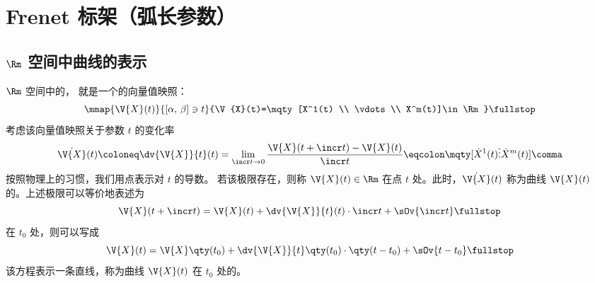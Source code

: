 \section{Frenet 标架（弧长参数）}
\subsection{\texorpdfstring{$\Rm$}{R\^{}m} 空间中曲线的表示}
$\Rm$ 空间中的，
就是一个的向量值映照：
\begin{equation}
	\mmap{\V{X}(t)}{[\alpha,\,\beta]\ni t}
		{\V{X}(t)=\mqty[X^1(t) \\ \vdots \\ X^m(t)]\in\Rm} \fullstop
\end{equation}
考虑该向量值映照关于参数 $t$ 的变化率
\begin{equation}
	\dot{\V{X}}(t)\coloneq\dv{\V{X}}{t} (t)
	=\lim_{\incr t\to 0} \frac{\V{X}(t+\incr t)-\V{X}(t)}{\incr t}
	\eqcolon \mqty[\dot{X}^1(t) \\ \vdots \\ \dot{X}^m(t)] \comma
\end{equation}
按照物理上的习惯，我们用点表示对 $t$ 的导数。
若该极限存在，则称 $\V{X}(t)\in\Rm$ 在点 $t$
处。此时，$\dot{\V{X}}(t)$ 称为曲线
$\V{X}(t)$ 的。上述极限可以等价地表述为
\begin{equation}
	\V{X}(t+\incr t) = \V{X}(t)+\dv{\V{X}}{t} (t) \cdot\incr t
		+\sOv{\incr t} \fullstop
\end{equation}
在 $t_0$ 处，则可以写成
\begin{equation}
	\V{X}(t) =\V{X}\qty(t_0)+\dv{\V{X}}{t} \qty(t_0)
		\cdot\qty(t-t_0)+\sOv{t-t_0} \fullstop
\end{equation}
该方程表示一条直线，称为曲线 $\V{X}(t)$
在 $t_0$ 处的。

